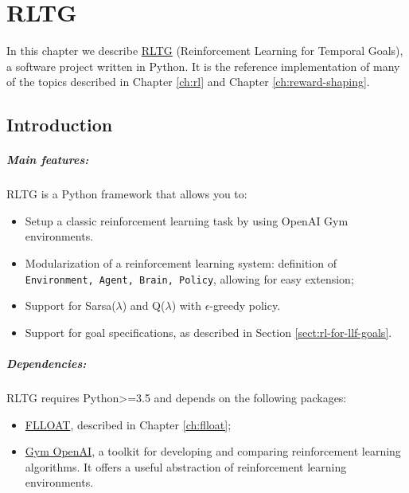\chapter{RLTG}\label{ch:rltg}
In this chapter we describe \href{https://github.com/MarcoFavorito/rltg.git}{RLTG} (Reinforcement Learning for Temporal Goals), a software project written in Python.  It is the reference implementation of many of the topics described in Chapter \ref{ch:rl} and Chapter \ref{ch:reward-shaping}. 


\section{Introduction}
\paragraph{Main features:} RLTG is a Python framework that allows you to:
\begin{itemize}
	
	\item Setup a classic reinforcement learning task by using OpenAI Gym environments.
	\item Modularization of a reinforcement learning system: definition of \texttt{Environment, Agent, Brain, Policy}, allowing for easy extension;
	\item Support for Sarsa($\lambda$) and Q($\lambda$) with $\epsilon$-greedy policy.
	\item Support for \LLf goal specifications, as described in Section \ref{sect:rl-for-llf-goals}.
	
\end{itemize}

\paragraph{Dependencies:} RLTG requires Python>=3.5 and depends on the following packages:
\begin{itemize}
	\item \href{https://github.com/MarcoFavorito/flloat.git}{FLLOAT}, described in Chapter \ref{ch:flloat};
	\item \href{https://gym.openai.com/}{Gym OpenAI}, a toolkit for developing and comparing reinforcement learning algorithms. It offers a useful abstraction of reinforcement learning environments.
\end{itemize}

